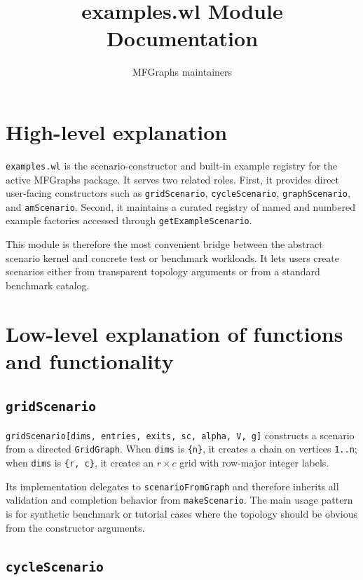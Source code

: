 \documentclass[11pt]{article}
\title{examples.wl Module Documentation}
\author{MFGraphs maintainers}
\date{}
\begin{document}
\maketitle

\section{High-level explanation}

\texttt{examples.wl} is the scenario-constructor and built-in example registry for the active MFGraphs package. It serves two related roles. First, it provides direct user-facing constructors such as \texttt{gridScenario}, \texttt{cycleScenario}, \texttt{graphScenario}, and \texttt{amScenario}. Second, it maintains a curated registry of named and numbered example factories accessed through \texttt{getExampleScenario}.

This module is therefore the most convenient bridge between the abstract scenario kernel and concrete test or benchmark workloads. It lets users create scenarios either from transparent topology arguments or from a standard benchmark catalog.

\section{Low-level explanation of functions and functionality}

\subsection*{\texttt{gridScenario}}

\texttt{gridScenario[dims, entries, exits, sc, alpha, V, g]} constructs a scenario from a directed \texttt{GridGraph}. When \texttt{dims} is \texttt{\{n\}}, it creates a chain on vertices \texttt{1..n}; when \texttt{dims} is \texttt{\{r, c\}}, it creates an $r \times c$ grid with row-major integer labels.

Its implementation delegates to \texttt{scenarioFromGraph} and therefore inherits all validation and completion behavior from \texttt{makeScenario}. The main usage pattern is for synthetic benchmark or tutorial cases where the topology should be obvious from the constructor arguments.

\subsection*{\texttt{cycleScenario}}
\end{document}
